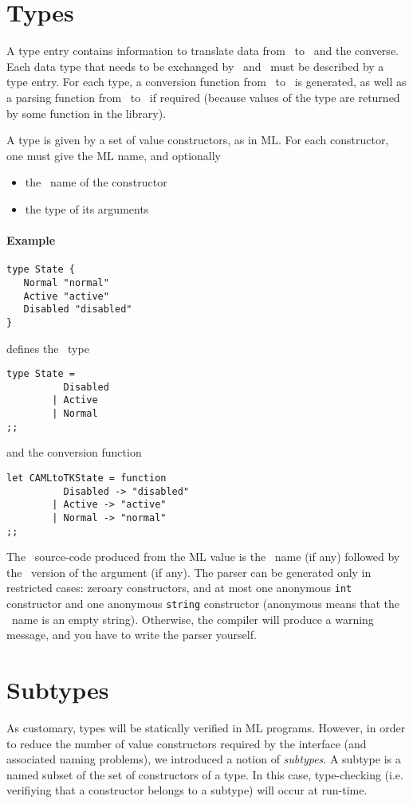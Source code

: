 \section{Types}
A type entry contains information to translate data from \caml\ to \tk\ 
and the converse. Each data type that needs to be exchanged by \caml\ and
\tk\ must be described by a type entry. For each type, a conversion function
from \caml\ to \tk\ is generated, as well as a parsing function from \tk\ to
\caml\ if required (because values of the type are returned by some
function in the library).

A type is given by a set of value constructors, as in ML. For each
constructor, one must give the ML name, and optionally
\begin{itemize}
\item the \tk\ name of the constructor
\item the type of its arguments
\end{itemize} 

\paragraph{Example}
\begin{verbatim}
type State { 
   Normal "normal"
   Active "active"
   Disabled "disabled"
}
\end{verbatim} 
defines the \caml\ type
\begin{verbatim}
type State =
          Disabled
        | Active
        | Normal
;;
\end{verbatim} 
and the conversion function
\begin{verbatim}
let CAMLtoTKState = function
          Disabled -> "disabled"
        | Active -> "active"
        | Normal -> "normal"
;;
\end{verbatim} 

The \tk\ source-code produced from the ML value is the \tk\ name (if any)
followed by the \tk\ version of the argument (if any).
The parser can be generated only in restricted cases: zeroary constructors,
and at most one anonymous \verb|int| constructor and one anonymous
\verb|string| constructor (anonymous means that the \tk\ name is an empty
string). Otherwise, the compiler will produce a warning
message, and you have to write the parser yourself. 

\section{Subtypes}
As customary, types will be statically verified in ML programs. However, in
order to reduce the number of value constructors required by the interface
(and associated naming problems),
we introduced a notion of {\em subtypes}. A subtype is a named subset of the
set of constructors of a type. In this case, type-checking (i.e. verifiying
that a constructor belongs to a subtype) will occur at run-time.

